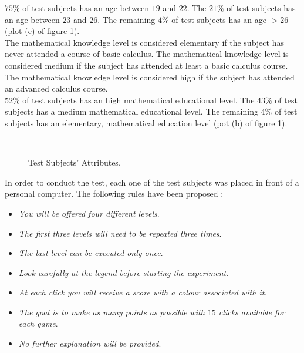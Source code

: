 $75\%$ of test subjects has an age between $19$ and $22$. The $21\%$ of test subjects has an age between $23$ and $26$. The remaining $4\%$ of test subjects has an age $> 26$ (plot (c) of figure \ref{fig:testSubjectsAttributes}). \\

The mathematical knowledge level is considered elementary if the subject has never attended a course of basic calculus. The mathematical knowledge level is considered medium if the subject has attended at least a basic calculus course. The mathematical knowledge level is considered high if the subject has attended an advanced calculus course. \\

$52\%$ of test subjects has an high mathematical educational level. The $43\%$ of test subjects has a medium mathematical educational level. The remaining $4\%$ of test subjects has an elementary, mathematical education level (pot (b) of figure \ref{fig:testSubjectsAttributes}). \\

\begin{figure}[h!]
	\begin{center}
		\\
	\end{center}
	\caption{
		Test Subjects' Attributes.
	}
	\label{fig:testSubjectsAttributes}
\end{figure}

In order to conduct the test, each one of the test subjects was placed in front of a personal computer. The following rules have been proposed :

\begin{itemize}
	\item \textit{You will be offered four different levels}.
	\item \textit{The first three levels will need to be repeated three times}.
	\item \textit{The last level can be executed only once}.
	\item \textit{Look carefully at the legend before starting the experiment}.
	\item \textit{At each click you will receive a score with a colour associated with it}.
	\item \textit{The goal is to make as many points as possible with $15$ clicks available for each game}.
	\item \textit{No further explanation will be provided}.
\end{itemize}

